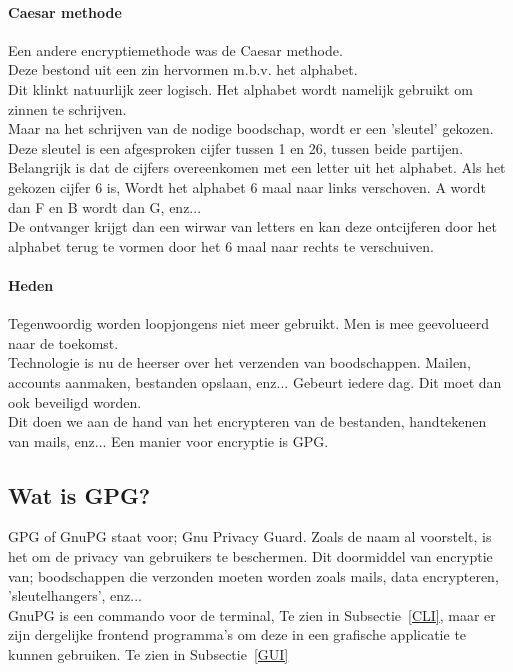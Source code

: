 \documentclass[12pt]{article}
\begin{document}
			\paragraph{Caesar methode}
				Een andere encryptiemethode was de Caesar methode.\\
				Deze bestond uit een zin hervormen m.b.v. het alphabet.\\ 
				Dit klinkt natuurlijk zeer logisch.
				Het alphabet wordt namelijk gebruikt om zinnen te schrijven.\\
				Maar na het schrijven van de nodige boodschap, wordt er een 'sleutel' gekozen. Deze sleutel is een afgesproken cijfer tussen 1 en 26, tussen beide partijen.\\
				Belangrijk is dat de cijfers overeenkomen met een letter uit het alphabet. Als het gekozen cijfer 6 is, Wordt het alphabet 6 maal naar links verschoven. A wordt dan F 									en B wordt dan G, enz...\\
				De ontvanger krijgt dan een wirwar van letters en kan deze ontcijferen door het alphabet terug te vormen door het 6 maal naar rechts te verschuiven.\\

			\newpage
			\paragraph{Heden}
				Tegenwoordig worden loopjongens niet meer gebruikt. Men is mee geevolueerd naar de toekomst.\\
				Technologie is nu de heerser over het verzenden van boodschappen.
				Mailen, accounts aanmaken, bestanden opslaan, enz... Gebeurt iedere dag. Dit moet dan ook beveiligd worden.\\
				Dit doen we aan de hand van het encrypteren van de bestanden, handtekenen van mails,
				enz...
				Een manier voor encryptie is GPG.

			\newpage
			\subsection{Wat is GPG?}\label{Wat}
				GPG of GnuPG staat voor; Gnu Privacy Guard. Zoals de naam al voorstelt, is het om de privacy van gebruikers te beschermen. Dit doormiddel van encryptie van; boodschappen 								die verzonden moeten worden zoals mails, data encrypteren, 'sleutelhangers', enz... \\
				GnuPG is een commando voor de terminal, Te zien in Subsectie~\ref{CLI}, maar er zijn dergelijke frontend programma's om deze in een grafische applicatie te kunnen 						gebruiken. Te zien in Subsectie~\ref{GUI}
\end{document}
